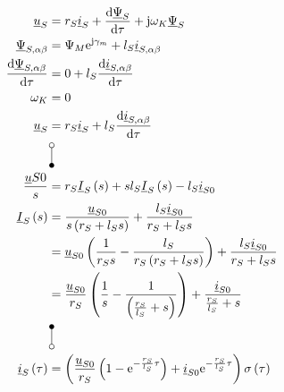 \documentclass[11pt,a4paper]{scrartcl}
\newcommand{\mybr}[1]{\left(#1\right)}
\renewcommand{\j}{\mathrm{j}}
\renewcommand{\u}{\underline{u}}
\newcommand{\I}{\underline{I}}
\renewcommand{\i}{\underline{i}}
\newcommand{\PPsi}{\underline{\Psi}}
\newcommand{\0}{_{\mybr{0}}}
\newcommand{\1}{_{\mybr{1}}}
\newcommand{\2}{_{\mybr{2}}}
\renewcommand{\e}{\mathrm{e}}
\renewcommand{\d}{\mathrm{d}}
\newcommand{\isab}{\i_{S,\alpha\beta}}
\newcommand{\psab}{\PPsi_{S,\alpha\beta}}
\begin{document}
\section{}
\begin{align}
\u_S&=r_S\i_S+\frac{\d\PPsi_S}{\d\tau}+\j\omega_K\PPsi_S\\
\psab&=\Psi_M\e^{\j\gamma_m}+l_S\isab\\
\frac{\d\psab}{\d\tau}&=0+l_S\frac{\d\isab}{\d\tau}\\
\omega_K&=0\\
\u_S&=r_S\i_S+l_S\frac{\d\isab}{\d\tau}\\
&\rotatebox[origin=c]{270}{\laplace}\nonumber\\
\frac{\u{S0}}{s}&=r_S\I_S\mybr{s}+s l_S\I_S\mybr{s}-l_S \i_{S0}\\
\I_S\mybr{s}&=\frac{\u_{S0}}{s\mybr{r_S+l_S s}}+\frac{l_S \i_{S0}}{r_S+l_S s}\\
&=\u_{S0}\mybr{\frac{1}{r_S s}-\frac{l_S}{r_S\mybr{r_S+l_S s}}}+\frac{l_S \i_{S0}}{r_S+l_S s}\\
&=\frac{\u_{S0}}{r_S}\mybr{\frac{1}{s}-\frac{1}{\mybr{\frac{r_S}{l_S}+ s}}}+\frac{\i_{S0}}{\frac{r_S}{l_S}+ s}\\
&\rotatebox[origin=c]{270}{\Laplace}\nonumber\\
\i_S\mybr{\tau}&=\mybr{\frac{\u_{S0}}{r_S}\mybr{1-\e^{-\frac{r_S}{l_S}\tau}}+\i_{S0}\e^{-\frac{r_S}{l_S}\tau}}\sigma\mybr{\tau}
\end{align}
\end{document}
